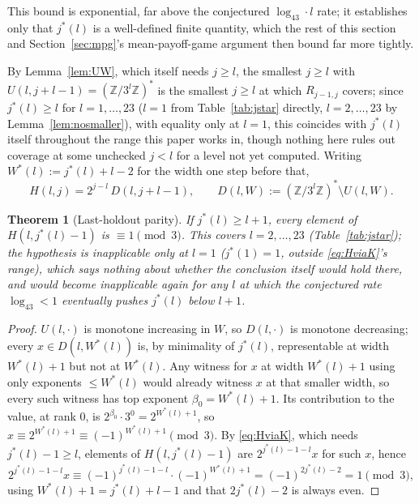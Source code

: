 \documentclass[11pt]{amsart}
\theoremstyle{plain}
\newtheorem{theorem}{Theorem}
\theoremstyle{definition}
\theoremstyle{remark}
\newcommand{\Z}{\mathbb{Z}}
\begin{document}
This bound is exponential, far above the conjectured $\log_43\cdot l$ rate; it establishes only that
$j^*(l)$ is a well-defined finite quantity, which the rest of this section and
Section~\ref{sec:mpg}'s mean-payoff-game argument then bound far more tightly.

By Lemma~\ref{lem:UW}, which itself needs $j\ge l$, the smallest $j\ge l$ with
$U(l,j+l-1)=(\Z/3^l\Z)^*$ is the smallest $j\ge l$ at which $R_{j-1,j}$ covers; since $j^*(l)\ge l$
for $l=1,\dots,23$ ($l=1$ from Table~\ref{tab:jstar} directly, $l=2,\dots,23$ by
Lemma~\ref{lem:nosmaller}), with equality only at $l=1$, this coincides with
$j^*(l)$ itself throughout the range this paper works in, though nothing here rules out coverage at
some unchecked $j<l$ for a level not yet computed. Writing $W^*(l):=j^*(l)+l-2$ for the width one
step before that,
\begin{equation}
\label{eq:HviaK}
H(l,j) = 2^{j-l}\,D(l,j+l-1), \qquad D(l,W) := (\Z/3^l\Z)^* \setminus U(l,W).
\end{equation}

\begin{theorem}[Last-holdout parity]
\label{thm:parity}
If $j^*(l)\ge l+1$, every element of $H(l,j^*(l)-1)$ is $\equiv1\pmod3$. This covers $l=2,\dots,23$
(Table~\ref{tab:jstar}); the hypothesis is inapplicable only at $l=1$ ($j^*(1)=1$, outside
\eqref{eq:HviaK}'s range), which says nothing about whether the conclusion itself would hold there,
and would become inapplicable again for any $l$ at which the conjectured rate $\log_43<1$ eventually
pushes $j^*(l)$ below $l+1$.
\end{theorem}

\begin{proof}
$U(l,\cdot)$ is monotone increasing in $W$, so $D(l,\cdot)$ is monotone decreasing; every
$x\in D(l,W^*(l))$ is, by minimality of $j^*(l)$, representable at width $W^*(l)+1$ but not at
$W^*(l)$. Any witness for $x$ at width $W^*(l)+1$ using only exponents $\le W^*(l)$ would already
witness $x$ at that smaller width, so every such witness has top exponent
$\beta_0 = W^*(l)+1$. Its contribution to the value, at rank $0$, is $2^{\beta_0}\cdot3^0 =
2^{W^*(l)+1}$, so $x \equiv 2^{W^*(l)+1} \equiv (-1)^{W^*(l)+1} \pmod3$. By \eqref{eq:HviaK}, which
needs $j^*(l)-1\ge l$, elements of $H(l,j^*(l)-1)$ are $2^{j^*(l)-1-l}x$ for such $x$, hence
\[
2^{j^*(l)-1-l}x \equiv (-1)^{j^*(l)-1-l}\cdot(-1)^{W^*(l)+1} = (-1)^{2j^*(l)-2} = 1 \pmod3,
\]
using $W^*(l)+1 = j^*(l)+l-1$ and that $2j^*(l)-2$ is always even.
\end{proof}
\end{document}
